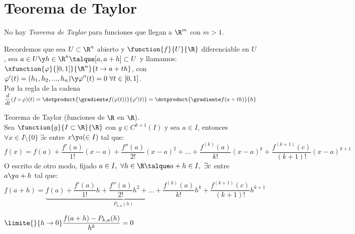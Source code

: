 	\section{Teorema de Taylor}

	\begin{nota} No hay \textit{Teorema de Taylor} para funciones que llegan a $\R^m$ con $m>1$.\end{nota}
	\begin{observacion} Recordemos que sea $U\subset \R^n$ abierto y $\function{f}{U}{\R}$ diferenciable en $U$, sea $a\in U\y h\in\R^n\talque [a,a+h]\subset U$ y llamamos:\\
	$\xfunction{\varphi}{[0,1]}{\R^n}{t\to a+th}$, con $\varphi'(t)=(h_1,h_2,...,h_n)\y\varphi''(t)=0\ \forall t\in[0,1]$.\\
	Por la regla de la cadena $\dfrac{d}{dt}(f\circ \varphi)(t)=\dotproduct{\gradiente f(\varphi(t))}{\varphi'(t)}=\dotproduct{\gradiente f(a+th)}{h}$
	\end{observacion}
	
	\begin{teor} Teorema de Taylor (funciones de $\R$ en $\R$).\\
	Sea $\function{g}{I\subset\R}{\R}$ con $g\in C^{k+1}(I)$ y sea $a\in I$, entonces $\forall x\in I\setminus\{0\}\ \exists c$ entre $x\y a\\
	(\in I)$ tal que:\\
	$f(x)=f(a)+\dfrac{f'(a)}{1!}(x-a)+\dfrac{f''(a)}{2!}(x-a)^2+...+\dfrac{f^{(k)}(a)}{k!}(x-a)^k+\dfrac{f^{(k+1)}(c)}{(k+1)!}(x-a)^{k+1}$\\
	O escrito de otro modo, fijado $a\in I,\ \forall h\in\R\talque a+h\in I,\ \exists c$ entre $a\y a+h$ tal que:
	$f(a+h)=\underset{P_{k,a}(h)}{\underbrace{f(a)+\dfrac{f'(a)}{1!}h+\dfrac{f''(a)}{2!}h^2+...+\dfrac{f^{(k)}(a)}{k!}h^k}}+\dfrac{f^{(k+1)}(c)}{(k+1)!}h^{k+1}$
	\end{teor}
	
	\begin{observacion} $\limite{}{h\to 0}\dfrac{f(a+h)-P_{k,a}(h)}{h^k}=0$\end{observacion}
	
